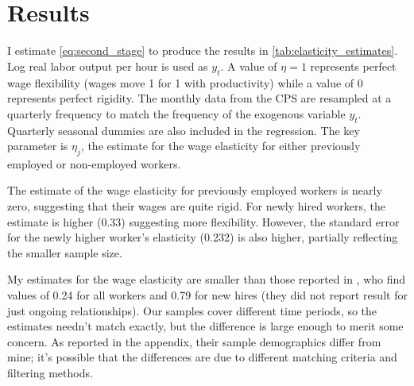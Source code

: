 \documentclass[11pt]{article}
\begin{document}

\section{Results}
\label{sec:results}

I estimate \autoref{eq:second_stage} to produce the results in \autoref{tab:elasticity_estimates}.
Log real labor output per hour is used as $y_t$.
A value of $\eta = 1$ represents perfect wage flexibility (wages move 1 for 1 with productivity) while a value of 0 represents perfect rigidity.
The monthly data from the CPS are resampled at a quarterly frequency to match the frequency of the exogenous variable $y_t$.
Quarterly seasonal dummies are also included in the regression.
The key parameter is $\eta_j$, the estimate for the wage elasticity for either previously employed or non-employed workers.

The estimate of the wage elasticity for previously employed workers is nearly zero, suggesting that their wages are quite rigid.
For newly hired workers, the estimate is higher (0.33) suggesting more flexibility.
However, the standard error for the newly higher worker's elasticity (0.232) is also higher, partially reflecting the smaller sample size.

My estimates for the wage elasticity are smaller than those reported in \cite{haefke_sonntag_vanRens_2013},  who find values of 0.24 for all workers and 0.79 for new hires (they did not report result for just ongoing relationships).
Our samples cover different time periods, so the estimates needn't match exactly, but the difference is large enough to merit some concern.
As reported in the appendix, their sample demographics differ from mine;
it's possible that the differences are due to different matching criteria and filtering methods.
\end{document}
